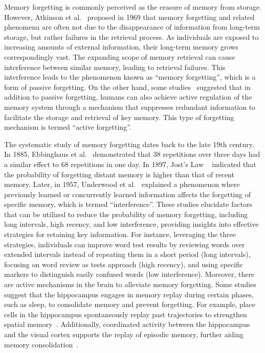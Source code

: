 \documentclass[journal,hideappendix]{vgtc}
\begin{document}
Memory forgetting is commonly perceived as the erasure of memory from storage. However, Atkinson et al.~\cite{shiffrin1969memory} proposed in 1969 that memory forgetting and related phenomena are often not due to the disappearance of information from long-term storage, but rather failures in the retrieval process. As individuals are exposed to increasing amounts of external information, their long-term memory grows correspondingly vast. The expanding scope of memory retrieval can cause interference between similar memory, leading to retrieval failures. 
This interference leads to the phenomenon known as ``memory forgetting'', which is a form of passive forgetting. 
On the other hand, some studies~\cite{hardt2013decay,medina2018neural,costanzi2021forgetting,anderson2021active} suggested that in addition to passive forgetting, humans can also achieve active regulation of the memory system through a mechanism that suppresses redundant information to facilitate the storage and retrieval of key memory.
This type of forgetting mechanism is termed ``active forgetting''.

The systematic study of memory forgetting dates back to the late 19th century. In 1885, Ebbinghaus et al.~\cite{ebbinghaus1885memory} demonstrated that 38 repetitions over three days had a similar effect to 68 repetitions in one day. In 1897, Jost's Law ~\cite{jost1897law} indicated that the probability of forgetting distant memory is higher than that of recent memory. Later, in 1957, Underwood et al.~\cite{underwood1957interference} explained a phenomenon where previously learned or concurrently learned information affects the forgetting of specific memory, which is termed ``interference''. These studies elucidate factors that can be utilized to reduce the probability of memory forgetting, including long intervals, high recency, and low interference, providing insights into effective strategies for retaining key information. For instance, leveraging the three strategies, individuals can improve word test results by reviewing words over extended intervals instead of repeating them in a short period (long intervals), focusing on word review as tests approach (high recency), and using specific markers to distinguish easily confused words (low interference). Moreover, there are active mechanisms in the brain to alleviate memory forgetting. Some studies suggest that the hippocampus engages in memory replay during certain phases, such as sleep, to consolidate memory and prevent forgetting. For example, place cells in the hippocampus spontaneously replay past trajectories to strengthen spatial memory~\cite{olafsdottir2018role}. Additionally, coordinated activity between the hippocampus and the visual cortex supports the replay of episodic memory, further aiding memory consolidation~\cite{ji2007coordinated}.
\end{document}
